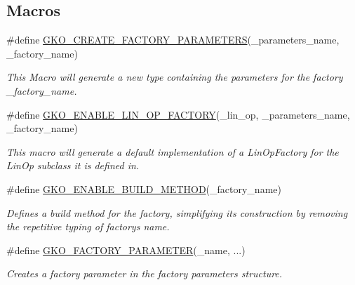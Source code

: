 \subsection*{Macros}
\begin{DoxyCompactItemize}
\item 
\#define \hyperlink{group__LinOp_ga1fc8e9d8be0c9ad2d72bc1ddfc6d8358}{G\+K\+O\+\_\+\+C\+R\+E\+A\+T\+E\+\_\+\+F\+A\+C\+T\+O\+R\+Y\+\_\+\+P\+A\+R\+A\+M\+E\+T\+E\+RS}(\+\_\+parameters\+\_\+name,  \+\_\+factory\+\_\+name)
\begin{DoxyCompactList}\small\item\em This Macro will generate a new type containing the parameters for the factory {\ttfamily \+\_\+factory\+\_\+name}. \end{DoxyCompactList}\item 
\#define \hyperlink{group__LinOp_ga8e0af90ec2414b768266f77cedffc309}{G\+K\+O\+\_\+\+E\+N\+A\+B\+L\+E\+\_\+\+L\+I\+N\+\_\+\+O\+P\+\_\+\+F\+A\+C\+T\+O\+RY}(\+\_\+lin\+\_\+op,  \+\_\+parameters\+\_\+name,  \+\_\+factory\+\_\+name)
\begin{DoxyCompactList}\small\item\em This macro will generate a default implementation of a Lin\+Op\+Factory for the Lin\+Op subclass it is defined in. \end{DoxyCompactList}\item 
\#define \hyperlink{group__LinOp_ga521f65604cc4cf427dcb2ecfa49b757c}{G\+K\+O\+\_\+\+E\+N\+A\+B\+L\+E\+\_\+\+B\+U\+I\+L\+D\+\_\+\+M\+E\+T\+H\+OD}(\+\_\+factory\+\_\+name)
\begin{DoxyCompactList}\small\item\em Defines a build method for the factory, simplifying its construction by removing the repetitive typing of factory\textquotesingle{}s name. \end{DoxyCompactList}\item 
\#define \hyperlink{group__LinOp_gaa037309884bbd0562b897cee95dd91c8}{G\+K\+O\+\_\+\+F\+A\+C\+T\+O\+R\+Y\+\_\+\+P\+A\+R\+A\+M\+E\+T\+ER}(\+\_\+name, ...)
\begin{DoxyCompactList}\small\item\em Creates a factory parameter in the factory parameters structure. \end{DoxyCompactList}\end{DoxyCompactItemize}
